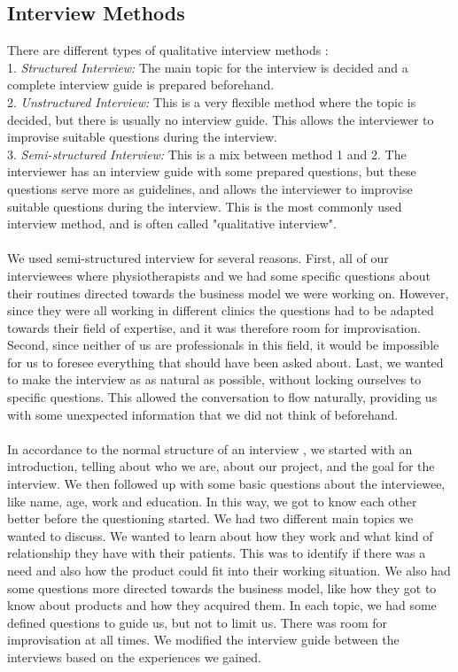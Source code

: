 \subsection{Interview Methods}
There are different types of qualitative interview methods \cite{interview} \cite{interview2}: \\ 
1. \emph{Structured Interview:} The main topic for the interview is decided and a complete interview guide is prepared beforehand. \\ 
2. \emph{Unstructured Interview:} This is a very flexible method where the topic is decided, but there is usually no interview guide. This allows the interviewer to improvise suitable questions during the interview. \\ 
3. \emph{Semi-structured Interview:} This is a mix between method 1 and 2. The interviewer has an interview guide with some prepared questions, but these questions serve more as guidelines, and allows the interviewer to improvise suitable questions during the interview. This is the most commonly used interview method, and is often called "qualitative interview".  \\ \\
We used semi-structured interview for several reasons. First, all of our interviewees where physiotherapists and we had some specific questions about their routines directed towards the business model we were working on. However, since they were all working in different clinics the questions had to be adapted towards their field of expertise, and it was therefore room for improvisation. Second, since neither of us are professionals in this field, it would be impossible for us to foresee everything that should have been asked about. Last, we wanted to make the interview as as natural as possible, without locking ourselves to specific questions. This allowed the conversation to flow naturally, providing us with some unexpected information that we did not think of beforehand. \\ \\
In accordance to the normal structure of an interview \cite{interview2}, we started with an introduction, telling about who we are, about our project, and the goal for the interview. We then followed up with some basic questions about the interviewee, like name, age, work and education. In this way, we got to know each other better before the questioning started. We had two different main topics we wanted to discuss. We wanted to learn about how they work and what kind of relationship they have with their patients. This was to identify if there was a need and also how the product could fit into their working situation. We also had some questions more directed towards the business model, like how they got to know about products and how they acquired them. In each topic, we had some defined questions to guide us, but not to limit us. There was room for improvisation at all times. We modified the interview guide between the interviews based on the experiences we gained.

